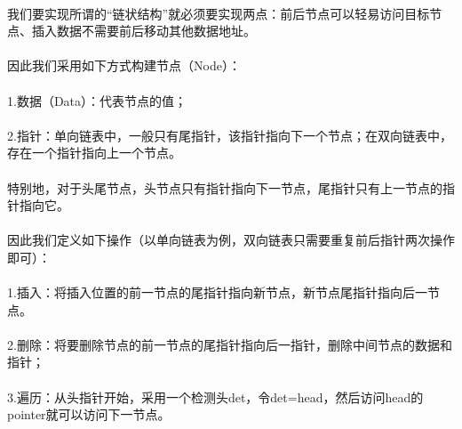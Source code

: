 \documentclass[12pt,a4paper,UTF16]{ctexbook}
\theoremstyle{plain}
\begin{document}
\paragraph{}我们要实现所谓的“链状结构”就必须要实现两点：前后节点可以轻易访问目标节点、插入数据不需要前后移动其他数据地址。
\paragraph{}因此我们采用如下方式构建节点（Node）：
\paragraph{}1.数据（Data）：代表节点的值；
\paragraph{}2.指针：单向链表中，一般只有尾指针，该指针指向下一个节点；在双向链表中，存在一个指针指向上一个节点。
\paragraph{}特别地，对于头尾节点，头节点只有指针指向下一节点，尾指针只有上一节点的指针指向它。
\paragraph{}因此我们定义如下操作（以单向链表为例，双向链表只需要重复前后指针两次操作即可）：
\paragraph{}1.插入：将插入位置的前一节点的尾指针指向新节点，新节点尾指针指向后一节点。
\paragraph{}2.删除：将要删除节点的前一节点的尾指针指向后一指针，删除中间节点的数据和指针；
\paragraph{}3.遍历：从头指针开始，采用一个检测头det，令det=head，然后访问head的pointer就可以访问下一节点。
\end{document}

